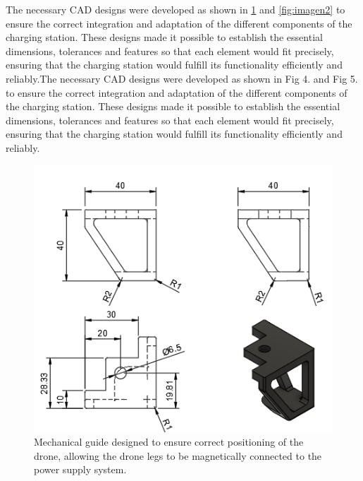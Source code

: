             The necessary CAD designs were developed as shown in \ref{fig:imagen1} and \ref{fig:imagen2} to ensure the correct integration and adaptation of the different components of the charging station. These designs made it possible to establish the essential dimensions, tolerances and features so that each element would fit precisely, ensuring that the charging station would fulfill its functionality efficiently and reliably.The necessary CAD designs were developed as shown in Fig 4. and Fig 5. to ensure the correct integration and adaptation of the different components of the charging station. These designs made it possible to establish the essential dimensions, tolerances and features so that each element would fit precisely, ensuring that the charging station would fulfill its functionality efficiently and reliably.
    \begin{figure}[h]
        \centering
        \begin{minipage}{0.45\textwidth}
            \centering
            \includegraphics[width=\textwidth]{pictures/PLANO_PATAS_ESTABILIDAD_CAJON.png}
            \caption{Mechanical guide designed to ensure correct positioning of the drone, allowing the drone legs to be magnetically connected to the power supply system.}
            \label{fig:imagen1}
        \end{minipage}%
        \hfill
        \begin{minipage}{0.45\textwidth}
            \centering

\end{minipage}
\end{figure}
